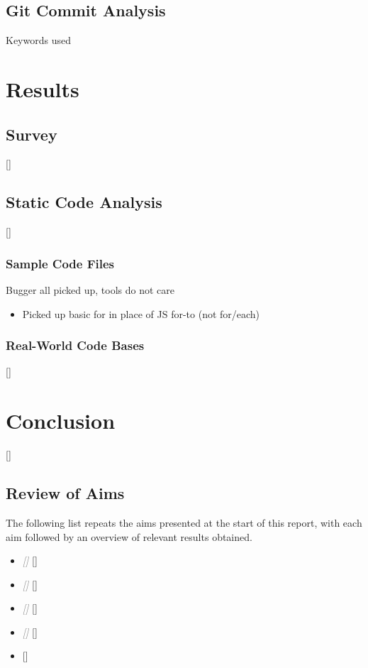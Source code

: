 \documentclass{article}
\begin{document}
    \subsection{Git Commit Analysis}
        Keywords used
    
\section{Results}
    \subsection{Survey}
            []
    \subsection{Static Code Analysis}
        []
        \subsubsection{Sample Code Files}
            Bugger all picked up, tools do not care
            \begin{itemize}
                \item Picked up basic for in place of JS for-to (not for/each)
            \end{itemize}
        \subsubsection{Real-World Code Bases}
            []
\section{Conclusion}
\label{sec:conclusion}
    []
    \subsection{Review of Aims}
        The following list repeats the aims presented at the start of this report, with each aim followed by an overview of relevant results obtained.
        \begin{itemize}
            \item \textcolor{gray}{\textit{[]}}
                []
            \item \textcolor{gray}{\textit{[]}}
                []
            \item \textcolor{gray}{\textit{[]}}
                []
            \item \textcolor{gray}{\textit{[]}}
                []
            \item \textcolor{gray}{\textit{}}
                []
        \end{itemize}
\end{document}
